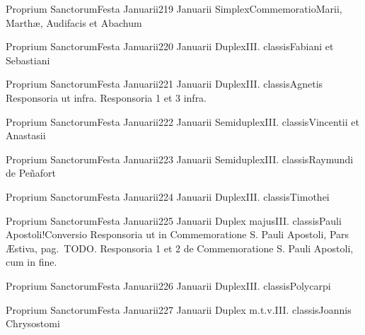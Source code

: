 \documentclass[liber-responsorialis_sanctorale.tex]{subfiles}
\begin{document}
	{Proprium Sanctorum}{Festa Januarii}{2}{19 Januarii}
	{Simplex}{Commemoratio}{Marii, Marthæ, Audifacis et Abachum}
	{}
	{}
\rubric{\respdetemp}

	{Proprium Sanctorum}{Festa Januarii}{2}{20 Januarii}
	{Duplex}{III. classis}{Fabiani et Sebastiani}
	{\pmexrubric}
	{\respdetemp}

	{Proprium Sanctorum}{Festa Januarii}{2}{21 Januarii}
	{Duplex}{III. classis}{Agnetis}
	{Responsoria ut infra.}
	{Responsoria 1 et 3 infra.}

	{Proprium Sanctorum}{Festa Januarii}{2}{22 Januarii}
	{Semiduplex}{III. classis}{Vincentii et Anastasii}
	{\pmexrubric}
	{\respdetemp}

	{Proprium Sanctorum}{Festa Januarii}{2}{23 Januarii}
	{Semiduplex}{III. classis}{Raymundi de Peñafort}
	{\conprubric}
	{\respdetemp}

	{Proprium Sanctorum}{Festa Januarii}{2}{24 Januarii}
	{Duplex}{III. classis}{Timothei}
	{\umexrubric}
	{\respdetemp}

	{Proprium Sanctorum}{Festa Januarii}{2}{25 Januarii}
	{Duplex majus}{III. classis}{Pauli Apostoli!Conversio}
	{Responsoria ut in Commemoratione S. Pauli Apostoli, Pars Æstiva, pag.\ TODO.}
	{Responsoria 1 et 2 de Commemoratione S. Pauli Apostoli, cum  in fine.}

	{Proprium Sanctorum}{Festa Januarii}{2}{26 Januarii}
	{Duplex}{III. classis}{Polycarpi}
	{\umexrubric}
	{\respdetemp}

	{Proprium Sanctorum}{Festa Januarii}{2}{27 Januarii}
	{Duplex m.t.v.}{III. classis}{Joannis Chrysostomi}
	{\copodorubric}
	{\respdetemp}
\end{document}
